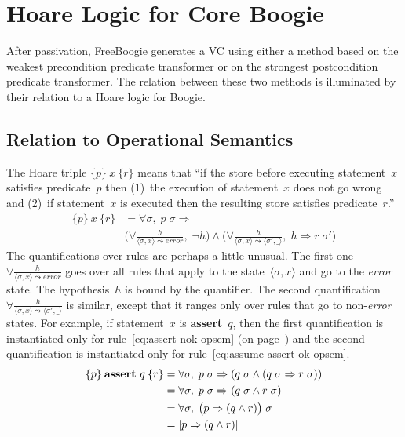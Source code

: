 \documentclass[a4paper]{article}
\newcommand{\hoare}[3]{\{#1\}\>\text{#2}\>\{#3\}}
\newcommand{\limp}{\Rightarrow}
\theoremstyle{slanted}
\theoremstyle{definition}
\theoremstyle{remark}
\begin{document}
\section{Hoare Logic for Core Boogie}
\label{sec:hoare-logic}

After passivation, FreeBoogie generates a VC using either a
method based on the weakest precondition predicate transformer
or on the strongest postcondition predicate transformer. The
relation between these two methods is illuminated by their
relation to a Hoare logic for Boogie.

\subsection{Relation to Operational Semantics}

The Hoare triple $\hoare{p}{$x$}{r}$ means that ``if the store
before executing statement~$x$ satisfies predicate~$p$ then
(1)~the execution of statement~$x$ does not go wrong and (2)~if
statement~$x$ is executed then the resulting store satisfies
predicate~$r$.''
\begin{equation}
\begin{split}
\hoare{p}{$x$}{r} &= 
  \forall \sigma,\; p\;\sigma \limp \\
  &
  \biggl(
  \forall \frac{h}{\langle\sigma,x\rangle\leadsto\mathit{error}},\; \lnot h
  \biggr) \land \biggl(
  \forall \frac{h}{\langle\sigma,x\rangle\leadsto\langle\sigma',\_\rangle},\;
    h\limp r\;\sigma'
  \biggr)
\end{split}
\label{eq:hoare-def}
\end{equation}
The quantifications over rules are
perhaps a little unusual. The first one $\forall
\frac{h}{\langle\sigma,x\rangle\leadsto\mathit{error}}$ goes
over all rules that apply to the state~$\langle\sigma,x\rangle$
and go to the \textit{error} state. The hypothesis~$h$ is
bound by the quantifier. The second quantification $\forall
\frac{h}{\langle\sigma,x\rangle\leadsto\langle\sigma',\_\rangle}$
is similar, except that it ranges only over rules that go
to non-\textit{error} states. For example, if statement~$x$
is \textbf{assert}~$q$, then the first quantification is
instantiated only for rule~\eqref{eq:assert-nok-opsem} (on
page~\pageref{eq:assert-nok-opsem}) and the second quantification
is instantiated only for rule~\eqref{eq:assume-assert-ok-opsem}.
\begin{equation}
\begin{split}
\hoare{p}{\textbf{assert}~$q$}{r}
  &= \forall\sigma,\; p\;\sigma \limp (q\;\sigma \land (q\;\sigma \limp r\;\sigma))\\
  &= \forall\sigma,\; p\;\sigma \limp (q\;\sigma \land r\;\sigma)\\
  &= \forall\sigma,\; \bigl(p \limp (q\land r)\bigr)\;\sigma\\
  &= |p\limp(q\land r)|
\end{split}
\end{equation}
\end{document}
